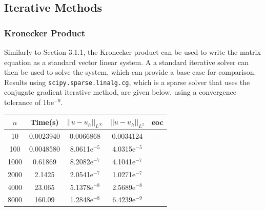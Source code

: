 \documentclass{article}
\numberwithin{equation}{section}
\begin{document}
\subsection{Iterative Methods}

\subsubsection{Kronecker Product}
Similarly to Section 3.1.1, the Kronecker product can be used to write the matrix equation as a standard vector linear system. A a standard iterative solver can then be used to solve the system, which can provide a base case for comparison. Results using \texttt{scipy.sparse.linalg.cg}, which is a sparse solver that uses the conjugate gradient iterative method, are given below, using a convergence tolerance of 1be$^{-9}$.

\begin{table}[H]
\centering
\begin{tabular}{|c|c|c|c|c|}
\hline
$n$ & Time(s) & $|| u - u_h ||_{L^{\infty}}$ &$|| u - u_h ||_{L^{2}}$ & eoc \\
\hline
10 & 0.0023940 & 0.0066868 & 0.0034124 & - \\
100 & 0.0048580 & 8.0611e$^{-5}$ & 4.0315e$^{-5}$ & \\
1000 & 0.61869 & 8.2082e$^{-7}$ & 4.1041e$^{-7}$ & \\
2000 & 2.1425 & 2.0541e$^{-7}$ & 1.0271e$^{-7}$ & \\
4000 & 23.065 & 5.1378e$^{-8}$ & 2.5689e$^{-8}$ & \\
8000 & 160.09 & 1.2848e$^{-8}$ & 6.4239e$^{-9}$ & \\
\hline
\end{tabular}
\end{table}
\end{document}
